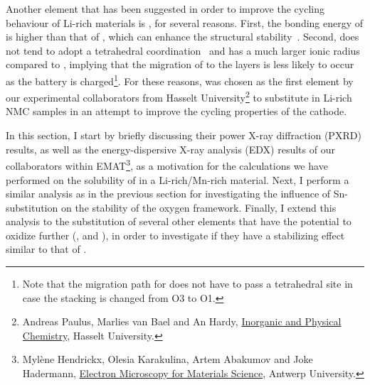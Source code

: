 \begin{refsection}
Another element that has been suggested in order to improve the cycling 
behaviour of Li-rich materials is , for several reasons. First, 
the bonding energy of  is higher than that of , which can 
enhance the structural stability~\cite{Qiao2015}. Second,  does 
not tend to adopt a tetrahedral coordination~\cite{Sathiya2013} and has a much 
larger ionic radius compared to , implying that the migration of 
 to the  layers is less likely to occur as the battery is 
charged\footnote{Note that the migration path for  does not have 
to pass a tetrahedral site in case the stacking is changed from O3 to O1.}. 
For these reasons,  was chosen as the first element by our 
experimental collaborators from Hasselt University\footnote{Andreas Paulus, 
Marlies van Bael and An Hardy, \href{https://www.uhasselt.be/UH/IMO/Visit-the-groups/Inorganic-and-physical-chemistry-(IPC).html}{Inorganic and Physical Chemistry}, Hasselt University.} to substitute in 
Li-rich NMC samples in an attempt to improve the cycling properties of the 
cathode. 

In this section, I start by briefly discussing their power X-ray diffraction (PXRD) results, as well as 
the energy-dispersive X-ray analysis (EDX) results of our collaborators within EMAT\footnote{Myl\`ene Hendrickx, Olesia 
Karakulina, Artem Abakumov and Joke Hadermann, \href{https://www.uantwerpen.be/en/research-groups/emat/}{Electron Microscopy for Materials 
Science}, Antwerp University.}, as a motivation for the 
calculations we have performed on the solubility of  in a 
Li-rich/Mn-rich material. Next, I perform a similar analysis as in the 
previous section for investigating the influence of Sn-substitution on the 
stability of the oxygen framework. Finally, I extend this analysis to the 
substitution of several other elements that have the potential to oxidize 
further (,  and ), in order to investigate if they have a 
stabilizing effect similar to that of .  

 

\end{refsection}

